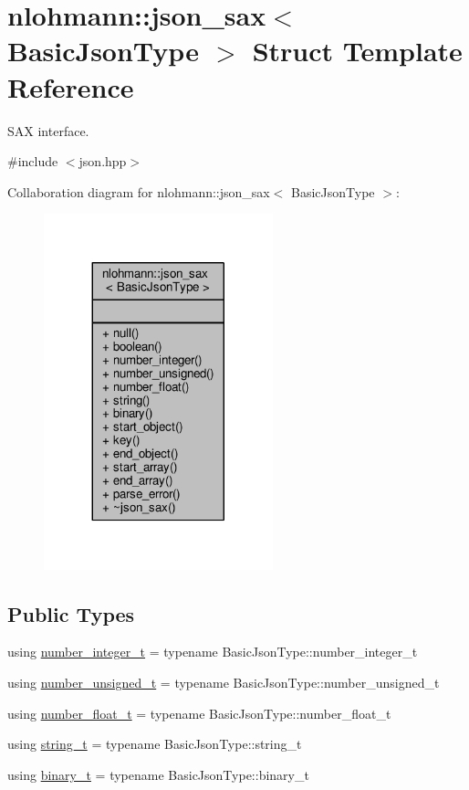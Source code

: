\hypertarget{structnlohmann_1_1json__sax}{}\section{nlohmann\+:\+:json\+\_\+sax$<$ Basic\+Json\+Type $>$ Struct Template Reference}
\label{structnlohmann_1_1json__sax}


S\+AX interface.  




{\ttfamily \#include $<$json.\+hpp$>$}



Collaboration diagram for nlohmann\+:\+:json\+\_\+sax$<$ Basic\+Json\+Type $>$\+:
\nopagebreak
\begin{figure}[H]
\begin{center}
\leavevmode
\includegraphics[width=188pt]{structnlohmann_1_1json__sax__coll__graph}
\end{center}
\end{figure}
\subsection*{Public Types}
\begin{DoxyCompactItemize}
\item 
using \hyperlink{structnlohmann_1_1json__sax_a0cef30121f02b7fee85e9708148ea0aa}{number\+\_\+integer\+\_\+t} = typename Basic\+Json\+Type\+::number\+\_\+integer\+\_\+t
\item 
using \hyperlink{structnlohmann_1_1json__sax_a32028cc056ae0f43aaae331cdbbbf856}{number\+\_\+unsigned\+\_\+t} = typename Basic\+Json\+Type\+::number\+\_\+unsigned\+\_\+t
\item 
using \hyperlink{structnlohmann_1_1json__sax_a390c209bffd8c4800c8f3076dc465a20}{number\+\_\+float\+\_\+t} = typename Basic\+Json\+Type\+::number\+\_\+float\+\_\+t
\item 
using \hyperlink{structnlohmann_1_1json__sax_ae01977a9f3c5b3667b7a2929ed91061e}{string\+\_\+t} = typename Basic\+Json\+Type\+::string\+\_\+t
\item 
using \hyperlink{structnlohmann_1_1json__sax_a0ef406ba81eef08aadf4a9ef48d742bd}{binary\+\_\+t} = typename Basic\+Json\+Type\+::binary\+\_\+t
\end{DoxyCompactItemize}
